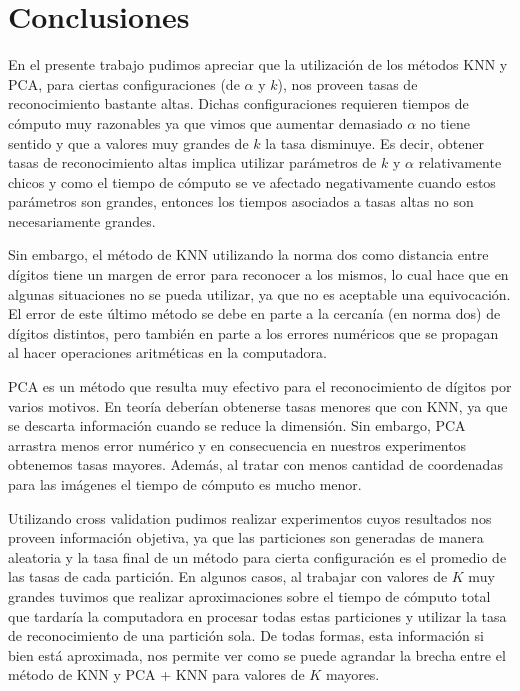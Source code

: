 \section{Conclusiones}

En el presente trabajo pudimos apreciar que la utilización de los métodos KNN y PCA, para ciertas configuraciones (de $\alpha$ y $k$), nos proveen tasas de reconocimiento bastante altas. Dichas configuraciones requieren tiempos de cómputo muy razonables ya que vimos que aumentar demasiado $\alpha$ no tiene sentido y que a valores muy grandes de $k$ la tasa disminuye. Es decir, obtener tasas de reconocimiento altas implica utilizar parámetros de $k$ y $\alpha$ relativamente chicos y como el tiempo de cómputo se ve afectado negativamente cuando estos parámetros son grandes, entonces los tiempos asociados a tasas altas no son necesariamente grandes.

Sin embargo, el método de KNN utilizando la norma dos como distancia entre dígitos tiene un margen de error para reconocer a los mismos, lo cual hace que en algunas situaciones no se pueda utilizar, ya que no es aceptable una equivocación. El error de este último método se debe en parte a la cercanía (en norma dos) de dígitos distintos, pero también en parte a los errores numéricos que se propagan al hacer operaciones aritméticas en la computadora.

PCA es un método que resulta muy efectivo para el reconocimiento de dígitos por varios motivos. En teoría deberían obtenerse tasas menores que con KNN, ya que se descarta información cuando se reduce la dimensión. Sin embargo, PCA arrastra menos error numérico y en consecuencia en nuestros experimentos obtenemos tasas mayores. Además, al tratar con menos cantidad de coordenadas para las imágenes el tiempo de cómputo es mucho menor.

Utilizando cross validation pudimos realizar experimentos cuyos resultados nos proveen información objetiva, ya que las particiones son generadas de manera aleatoria y la tasa final de un método para cierta configuración es el promedio de las tasas de cada partición. En algunos casos, al trabajar con valores de $K$ muy grandes tuvimos que realizar aproximaciones sobre el tiempo de cómputo total que tardaría la computadora en procesar todas estas particiones y utilizar la tasa de reconocimiento de una partición sola. De todas formas, esta información si bien está aproximada, nos permite ver como se puede agrandar la brecha entre el método de KNN y PCA + KNN para valores de $K$ mayores.

